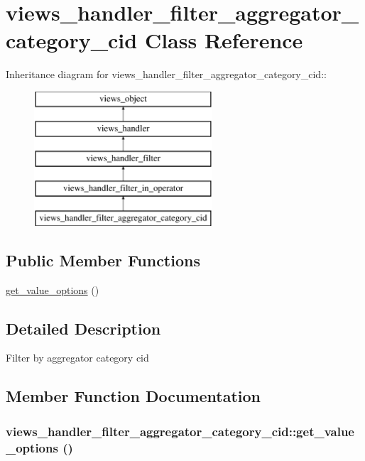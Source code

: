 \hypertarget{classviews__handler__filter__aggregator__category__cid}{
\section{views\_\-handler\_\-filter\_\-aggregator\_\-category\_\-cid Class Reference}
\label{classviews__handler__filter__aggregator__category__cid}
}
Inheritance diagram for views\_\-handler\_\-filter\_\-aggregator\_\-category\_\-cid::\begin{figure}[H]
\begin{center}
\leavevmode
\includegraphics[height=5cm]{classviews__handler__filter__aggregator__category__cid}
\end{center}
\end{figure}
\subsection*{Public Member Functions}
\begin{CompactItemize}
\item 
\hyperlink{classviews__handler__filter__aggregator__category__cid_d0fa87d5c7f9bcb955b163c6587cd790}{get\_\-value\_\-options} ()
\end{CompactItemize}


\subsection{Detailed Description}
Filter by aggregator category cid 

\subsection{Member Function Documentation}
\hypertarget{classviews__handler__filter__aggregator__category__cid_d0fa87d5c7f9bcb955b163c6587cd790}{
\subsubsection[{get\_\-value\_\-options}]{\setlength{\rightskip}{0pt plus 5cm}views\_\-handler\_\-filter\_\-aggregator\_\-category\_\-cid::get\_\-value\_\-options ()}}
\label{classviews__handler__filter__aggregator__category__cid_d0fa87d5c7f9bcb955b163c6587cd790}


